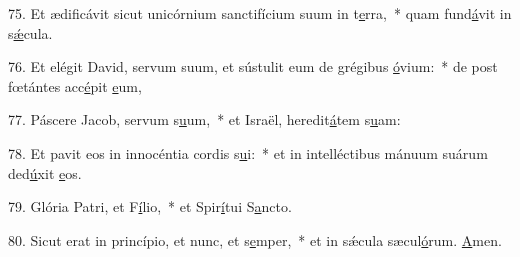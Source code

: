 75. Et ædificávit sicut unicórnium sanctifícium suum in t\uline{e}rra,~* quam fund\uline{á}vit in s\uline{ǽ}cula.\par 
76. Et elégit David, servum suum, et sústulit eum de grégibus \uline{ó}vium:~* de post fœtántes acc\uline{é}pit \uline{e}um,\par 
77. Páscere Jacob, servum s\uline{u}um,~* et Israël, heredit\uline{á}tem s\uline{u}am:\par 
78. Et pavit eos in innocéntia cordis s\uline{u}i:~* et in intelléctibus mánuum suárum ded\uline{ú}xit \uline{e}os.\par 
79. Glória Patri, et F\uline{í}lio,~* et Spir\uline{í}tui S\uline{a}ncto.\par 
80. Sicut erat in princípio, et nunc, et s\uline{e}mper,~* et in sǽcula sæcul\uline{ó}rum. \uline{A}men.\par 
